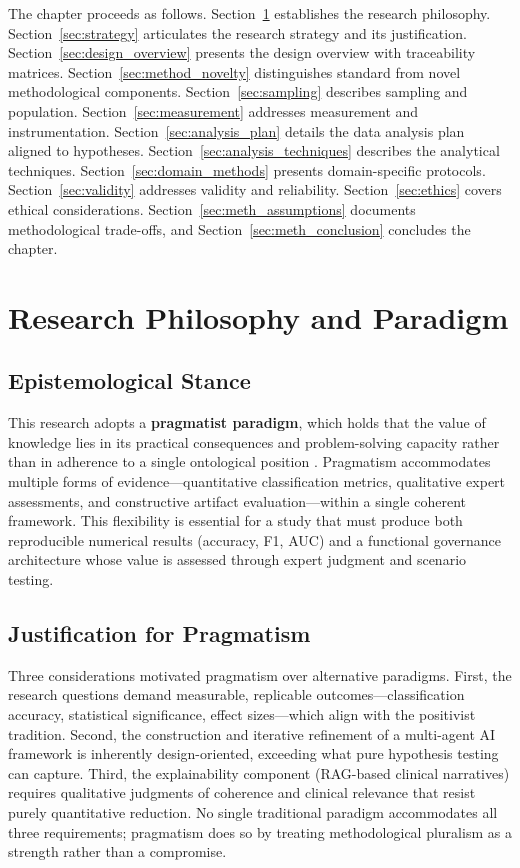 The chapter proceeds as follows. Section~\ref{sec:philosophy} establishes the research philosophy. Section~\ref{sec:strategy} articulates the research strategy and its justification. Section~\ref{sec:design_overview} presents the design overview with traceability matrices. Section~\ref{sec:method_novelty} distinguishes standard from novel methodological components. Section~\ref{sec:sampling} describes sampling and population. Section~\ref{sec:measurement} addresses measurement and instrumentation. Section~\ref{sec:analysis_plan} details the data analysis plan aligned to hypotheses. Section~\ref{sec:analysis_techniques} describes the analytical techniques. Section~\ref{sec:domain_methods} presents domain-specific protocols. Section~\ref{sec:validity} addresses validity and reliability. Section~\ref{sec:ethics} covers ethical considerations. Section~\ref{sec:meth_assumptions} documents methodological trade-offs, and Section~\ref{sec:meth_conclusion} concludes the chapter.

\section{Research Philosophy and Paradigm}
\label{sec:philosophy}

\subsection{Epistemological Stance}

This research adopts a \textbf{pragmatist paradigm}, which holds that the value of knowledge lies in its practical consequences and problem-solving capacity rather than in adherence to a single ontological position \citep{creswell2018research}. Pragmatism accommodates multiple forms of evidence---quantitative classification metrics, qualitative expert assessments, and constructive artifact evaluation---within a single coherent framework. This flexibility is essential for a study that must produce both reproducible numerical results (accuracy, F1, AUC) and a functional governance architecture whose value is assessed through expert judgment and scenario testing.

\subsection{Justification for Pragmatism}

Three considerations motivated pragmatism over alternative paradigms. First, the research questions demand measurable, replicable outcomes---classification accuracy, statistical significance, effect sizes---which align with the positivist tradition. Second, the construction and iterative refinement of a multi-agent AI framework is inherently design-oriented, exceeding what pure hypothesis testing can capture. Third, the explainability component (RAG-based clinical narratives) requires qualitative judgments of coherence and clinical relevance that resist purely quantitative reduction. No single traditional paradigm accommodates all three requirements; pragmatism does so by treating methodological pluralism as a strength rather than a compromise.

